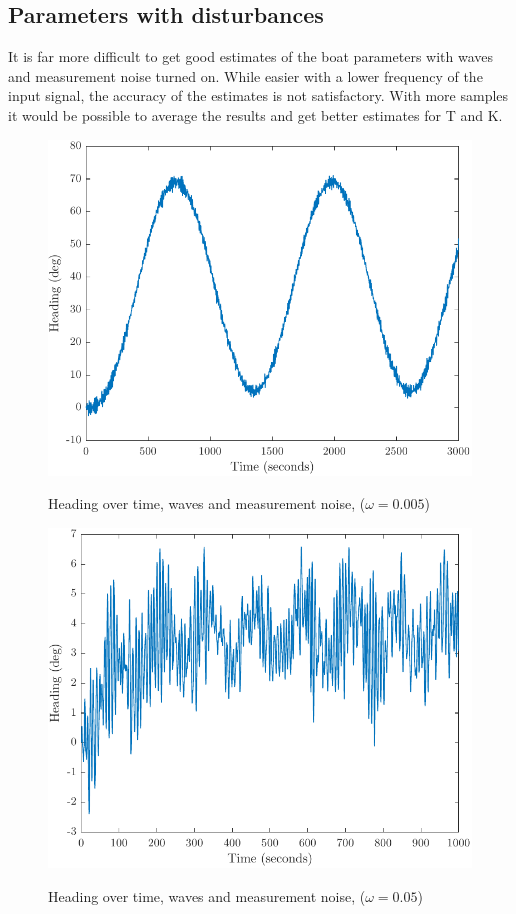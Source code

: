 \subsection{Parameters with disturbances}
It is far more difficult to get good estimates of the boat parameters with waves and measurement noise
turned on. While easier with a lower frequency of the input signal, the accuracy of the estimates is not
satisfactory. With more samples it would be possible to average the results and get better estimates for
T and K. 

\begin{figure}[ht]
    \centering
    \begin{minipage}[b]{0.48\textwidth}
        \includegraphics[width=\textwidth]{"images/1c-omega_lik_0005"}
        \label{fig:1c-omega=0.0005}
        \caption{Heading over time, waves and measurement noise, ($\omega = 0.005$)}
    \end{minipage}
    \hfill
    \begin{minipage}[b]{0.48\textwidth}
        \includegraphics[width=\textwidth]{"images/1c-omega_lik_005"}
        \label{fig:1c-omega=0.005}
        \caption{Heading over time, waves and measurement noise, ($\omega = 0.05$)}
    \end{minipage}
\end{figure}


